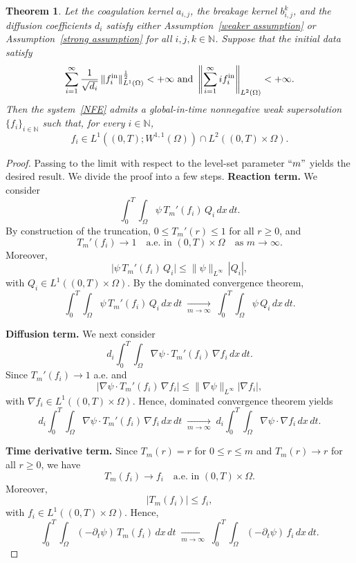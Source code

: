 \documentclass[a4paper,12pt,reqno]{amsart}
\theoremstyle{plain}
\newtheorem{thm}{Theorem}[section]
\numberwithin{equation}{section}
\begin{document}
	
	\begin{thm}\label{existence result_supersolution}
		Let the coagulation kernel $a_{i,j}$, the breakage kernel $b_{i,j}^k$, and the diffusion coefficients $d_i$ satisfy either Assumption~\ref{weaker assumption} or Assumption~\ref{strong assumption} for all $i,j,k \in \mathbb{N}$. Suppose that the initial data satisfy
		\[
		\sum_{i=1}^{\infty} \frac{1}{\sqrt{d_i}} \, \|f_i^{\rm{in}}\|_{L^1(\Omega)}^{\frac12} < +\infty \ \mbox{and} \ \left\|\sum_{i=1}^{\infty}if_i^{\rm{in}}\right\|_{L^2(\Omega)}<+\infty.
		\]
		Then the system~\eqref{NFE} admits a global-in-time nonnegative weak supersolution $\{f_i\}_{i\in\mathbb{N}}$ such that, for every $i \in \mathbb{N}$,
		\[
		f_i \in L^1\!\left((0,T); W^{1,1}(\Omega)\right)
		\cap L^2\!\left((0,T)\times\Omega\right).
		\]
	\end{thm}
	\begin{proof}
		Passing to the limit with respect to the level-set parameter $``m"$ yields the desired
		result. We divide the proof into a few steps.
		\newline
		\textbf{Reaction term.}
		We consider
		\[
		\int_0^T\!\!\int_\Omega
		\psi\,T_m'(f_i)\,Q_i \,dx\,dt.
		\]
		By construction of the truncation, $0 \le T_m'(r) \le 1$ for all $r\ge0$, and
		\[
		T_m'(f_i) \longrightarrow 1
		\quad \text{a.e. in } (0,T)\times\Omega
		\quad \text{as } m \to \infty.
		\]
		Moreover,
		\[
		\big|\psi\,T_m'(f_i)\,Q_i\big|
		\le
		\|\psi\|_{L^\infty}\,|Q_i|,
		\]
		with $Q_i \in L^1((0,T)\times\Omega)$.  
		By the dominated convergence theorem,
		\[
		\int_0^T\!\!\int_\Omega
		\psi\,T_m'(f_i)\,Q_i \,dx\,dt
		\;\xrightarrow[m\to\infty]{}\;
		\int_0^T\!\!\int_\Omega
		\psi\,Q_i \,dx\,dt.
		\]
		
		\medskip
		
		\noindent\textbf{Diffusion term.}
		We next consider
		\[
		d_i \int_0^T\!\!\int_\Omega
		\nabla\psi \cdot T_m'(f_i)\,\nabla f_i \,dx\,dt.
		\]
		Since $T_m'(f_i)\to1$ a.e. and
		\[
		\big|\nabla\psi \cdot T_m'(f_i)\,\nabla f_i\big|
		\le
		\|\nabla\psi\|_{L^\infty} |\nabla f_i|,
		\]
		with $\nabla f_i \in L^1((0,T)\times\Omega)$. Hence, dominated convergence theorem yields
		\[
		d_i \int_0^T\!\!\int_\Omega
		\nabla\psi \cdot T_m'(f_i)\,\nabla f_i \,dx\,dt
		\;\xrightarrow[m\to\infty]{}\;
		d_i \int_0^T\!\!\int_\Omega
		\nabla\psi \cdot \nabla f_i \,dx\,dt.
		\]
		
		\medskip
		
		\noindent\textbf{Time derivative term.}
		Since $T_m(r)=r$ for $0\le r\le m$ and $T_m(r)\to r$ for all $r\ge0$, we have
		\[
		T_m(f_i) \longrightarrow f_i
		\quad \text{a.e. in } (0,T)\times\Omega.
		\]
		Moreover,
		\[
		|T_m(f_i)| \le f_i,
		\]
		with $f_i \in L^1((0,T)\times\Omega)$. Hence,
		\[
		\int_0^T\!\!\int_\Omega
		(-\partial_t\psi)\,T_m(f_i)\,dx\,dt
		\;\xrightarrow[m\to\infty]{}\;
		\int_0^T\!\!\int_\Omega
		(-\partial_t\psi)\,f_i\,dx\,dt.
		\]
		

\end{proof}
\end{document}
